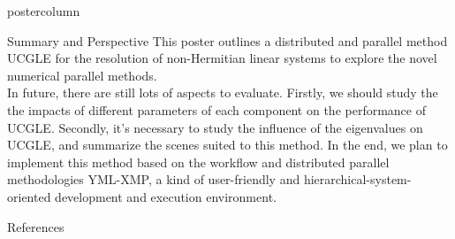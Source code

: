 \documentclass{beamer}
\begin{document}
\begin{frame}
\begin{columns}
\begin{column}{.33\textwidth}
\begin{beamercolorbox}[center]{postercolumn}
\begin{minipage}{.98\textwidth}
{					\begin{myblock}{Summary and Perspective}
This poster outlines a distributed and parallel method UCGLE for the resolution of non-Hermitian linear systems to explore the novel numerical parallel methods. \\
\vspace{0.1em}
In future, there are still lots of aspects to evaluate. Firstly, we should study the the impacts of different parameters of each component on the performance of UCGLE. Secondly, it’s necessary to study the influence of the eigenvalues on UCGLE, and summarize the scenes suited to this method. In the end, we plan to implement this method based on the workflow and distributed parallel methodologies YML-XMP, a kind of user-friendly and hierarchical-system-oriented development and execution environment.

					\end{myblock}


					\begin{myblock}{References}
						\footnotesize
						
						
					\end{myblock}

		}\end{minipage}\end{beamercolorbox}
	\end{column}
\end{columns}
\end{frame}
\end{document}

